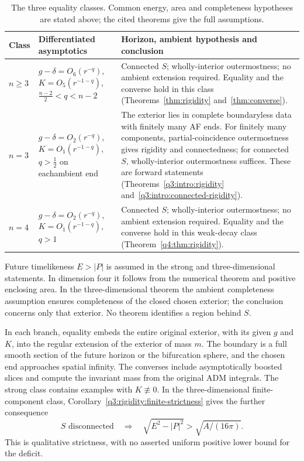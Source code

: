 \begin{table}[htbp]
\centering
\small
\renewcommand{\arraystretch}{1.13}
\begin{tabular}{@{}p{}p{}p{}@{}}
\toprule
Class & Differentiated asymptotics & Horizon, ambient hypothesis and conclusion \\
\midrule
$n\ge3$ &
$g-\delta=O_6(r^{-q})$,\newline
$K=O_5(r^{-1-q})$,\newline
$\frac{n-2}{2}<q<n-2$ &
Connected $S$; wholly-interior outermostness; no ambient extension
required. Equality and the converse hold in this class
(Theorems~\ref{thm:rigidity} and~\ref{thm:converse}). \\
\addlinespace
$n=3$ &
$g-\delta=O_2(r^{-q})$,\newline
$K=O_1(r^{-1-q})$,\newline
$q>\frac12$ on each\newline ambient end &
The exterior lies in complete boundaryless data with finitely many AF
ends. For finitely many components, partial-coincidence outermostness
gives rigidity and connectedness; for connected $S$, wholly-interior outermostness
suffices. These are forward statements
(Theorems~\ref{q3:intro:rigidity} and~\ref{q3:intro:connected-rigidity}). \\
\addlinespace
$n=4$ &
$g-\delta=O_2(r^{-q})$,\newline
$K=O_1(r^{-1-q})$,\newline
$q>1$ &
Connected $S$; wholly-interior outermostness; no ambient extension
required. Equality and the converse hold in this weak-decay class
(Theorem~\ref{q4:thm:rigidity}). \\
\bottomrule
\end{tabular}
\caption{The three equality classes. Common energy, area and completeness
hypotheses are stated above; the cited theorems give the full assumptions.}
\label{tab:intro:branches}
\end{table}

Future timelikeness $E>|P|$ is assumed in the strong and
three-dimensional statements. In dimension four it follows from the
numerical theorem and positive enclosing area. In the
three-dimensional theorem the ambient completeness assumption ensures
completeness of the closed chosen exterior; the conclusion concerns
only that exterior. No theorem identifies a region behind $S$.

In each branch, equality embeds the entire original exterior, with
its given $g$ and $K$, into the regular extension of the exterior of
mass $m$. The boundary is a full smooth section of the future horizon
or the bifurcation sphere, and the chosen end approaches spatial
infinity. The converses include asymptotically boosted slices and
compute the invariant mass from the original ADM integrals. The
strong class contains examples with $K\not\equiv0$. In the
three-dimensional finite-component class,
Corollary~\ref{q3:rigidity:finite-strictness} gives the further consequence
\[
 S\text{ disconnected}\quad\Longrightarrow\quad
 \sqrt{E^2-|P|^2}>\sqrt{A/(16\pi)}.
\]
This is qualitative strictness, with no asserted uniform positive
lower bound for the deficit.


